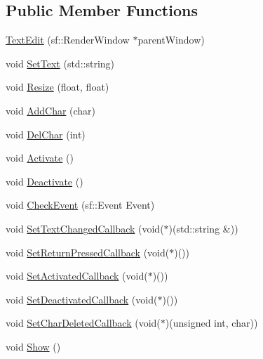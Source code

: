 \subsection*{Public Member Functions}
\begin{CompactItemize}
\item 
\hyperlink{classsfgui_1_1TextEdit_c6f2d938ccf876f05a9a9c47060c6093}{TextEdit} (sf::RenderWindow $\ast$parentWindow)
\item 
void \hyperlink{classsfgui_1_1TextEdit_c6f06a7dc81611a50226e10287e87e1e}{SetText} (std::string)
\item 
void \hyperlink{classsfgui_1_1TextEdit_58afd20cc7cec80bf02603cc5e47143a}{Resize} (float, float)
\item 
void \hyperlink{classsfgui_1_1TextEdit_203952f38ce3bd68695597fee4b4397b}{AddChar} (char)
\item 
void \hyperlink{classsfgui_1_1TextEdit_dc95dab7bac1c41d0cebff1268f80c22}{DelChar} (int)
\item 
void \hyperlink{classsfgui_1_1TextEdit_bcd256e053ae8f13a5c7f919f79c03c9}{Activate} ()
\item 
void \hyperlink{classsfgui_1_1TextEdit_49b0919fd6c43c35913f8a46a6788270}{Deactivate} ()
\item 
void \hyperlink{classsfgui_1_1TextEdit_af6d4be3633d3eb8bcc7a1007e324da8}{CheckEvent} (sf::Event Event)
\item 
void \hyperlink{classsfgui_1_1TextEdit_2c80f417ea995a6452fcb47740701e1e}{SetTextChangedCallback} (void($\ast$)(std::string \&))
\item 
void \hyperlink{classsfgui_1_1TextEdit_b60f88cc667196bb073091e8878483f4}{SetReturnPressedCallback} (void($\ast$)())
\item 
void \hyperlink{classsfgui_1_1TextEdit_68bda298b3563eb960e77c3712664db8}{SetActivatedCallback} (void($\ast$)())
\item 
void \hyperlink{classsfgui_1_1TextEdit_6d75bcac8949d08513caa72e898e9b43}{SetDeactivatedCallback} (void($\ast$)())
\item 
void \hyperlink{classsfgui_1_1TextEdit_02d743ef07c871b2ce4666083157628c}{SetCharDeletedCallback} (void($\ast$)(unsigned int, char))
\item 
void \hyperlink{classsfgui_1_1TextEdit_1ee03247816213b34caaff365b160de0}{Show} ()
\end{CompactItemize}

